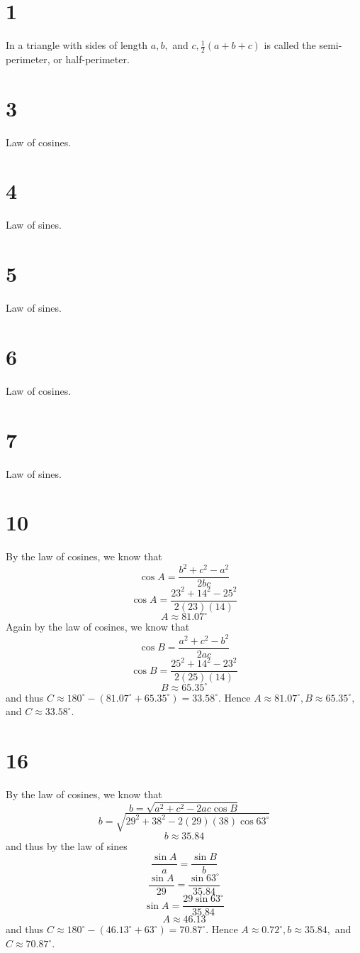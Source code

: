 \documentclass{article}
\theoremstyle{definition}
\newcommand{\?}{\stackrel{?}{=}}
\begin{document}
\section*{1}
In a triangle with sides of length $a,b,$ and $c,\frac{1}{2}(a+b+c)$ is called the semi-perimeter, or half-perimeter.

\section*{3}
Law of cosines.

\section*{4}
Law of sines.

\section*{5}
Law of sines.

\section*{6}
Law of cosines.

\section*{7}
Law of sines.

\section*{10}
By the law of cosines, we know that
\[ \cos A=\dfrac{b^2+c^2-a^2}{2bc} \]
\[ \cos A=\dfrac{23^2+14^2-25^2}{2(23)(14)} \]
\[ A\approx 81.07^\circ \]
Again by the law of cosines, we know that
\[ \cos B=\dfrac{a^2+c^2-b^2}{2ac} \]
\[ \cos B=\dfrac{25^2+14^2-23^2}{2(25)(14)} \]
\[ B\approx 65.35^\circ \]
and thus $C\approx 180^\circ-(81.07^\circ+65.35^\circ)=33.58^\circ$. Hence
$A\approx 81.07^\circ,B\approx 65.35^\circ,$ and $C\approx 33.58^\circ$.

\section*{16}
By the law of cosines, we know that
\[ b=\sqrt{a^2+c^2-2ac\cos B} \]
\[ b=\sqrt{29^2+38^2-2(29)(38)\cos 63^\circ} \]
\[ b\approx 35.84 \]
and thus by the law of sines
\[ \frac{\sin A}{a}=\frac{\sin B}{b} \]
\[ \frac{\sin A}{29}=\frac{\sin 63^\circ}{35.84} \]
\[ \sin A=\frac{29\sin 63^\circ}{35.84} \]
\[ A\approx 46.13 \]
and thus $C\approx 180^\circ-(46.13^\circ+63^\circ)=70.87^\circ$. Hence
$A\approx 0.72^\circ,b\approx 35.84,$ and $C\approx 70.87^\circ$.
\end{document}
